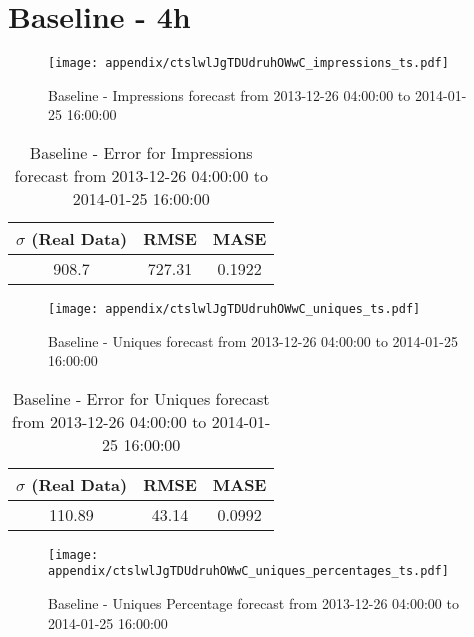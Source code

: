 \section{Baseline - 4h}
\begin{figure}[H] \begin{center} \leavevmode
\texttt{[image: appendix/ctslwlJgTDUdruhOWwC\_impressions\_ts.pdf]} \caption{
Baseline - Impressions forecast from 2013-12-26 04:00:00 to 2014-01-25 16:00:00} \label{fig:appendix/ctslwlJgTDUdruhOWwC_impressions_ts.pdf} \end{center}
\end{figure}

\begin{table}[H]
\centering
\footnotesize
\begin{tabular}{ccc}
$\sigma$ (Real Data) & RMSE & MASE   \\ \hline
908.7 & 727.31 & 0.1922 \\
\end{tabular}

\vspace{0.5cm}

\caption{
Baseline - Error for Impressions forecast from 2013-12-26 04:00:00 to 2014-01-25 16:00:00}
\end{table}

\begin{figure}[H] \begin{center} \leavevmode
\texttt{[image: appendix/ctslwlJgTDUdruhOWwC\_uniques\_ts.pdf]} \caption{
Baseline - Uniques forecast from 2013-12-26 04:00:00 to 2014-01-25 16:00:00} \label{fig:appendix/ctslwlJgTDUdruhOWwC_uniques_ts.pdf} \end{center}
\end{figure}

\begin{table}[H]
\centering
\footnotesize
\begin{tabular}{ccc}
$\sigma$ (Real Data) & RMSE & MASE   \\ \hline
110.89 & 43.14 & 0.0992 \\
\end{tabular}

\vspace{0.5cm}

\caption{
Baseline - Error for Uniques forecast from 2013-12-26 04:00:00 to 2014-01-25 16:00:00}
\end{table}

\begin{figure}[H] \begin{center} \leavevmode
\texttt{[image: appendix/ctslwlJgTDUdruhOWwC\_uniques\_percentages\_ts.pdf]} \caption{
Baseline - Uniques Percentage forecast from 2013-12-26 04:00:00 to 2014-01-25 16:00:00} \label{fig:appendix/ctslwlJgTDUdruhOWwC_uniques_percentages_ts.pdf} \end{center}
\end{figure}

